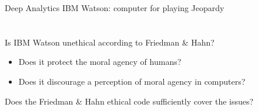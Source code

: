 \documentclass{beamer}
\begin{document}
\begin{frame}{Deep Analytics}
IBM Watson: computer for playing Jeopardy \\
\href{http://www.youtube.com/watch?v=14r0eD2HWbo&t=14m51s}{} \\
\href{http://www.youtube.com/watch?v=DywO4zksfXw}{} \\
\bigskip
Is IBM Watson unethical according to Friedman \& Hahn?
\begin{itemize}
\item Does it protect the moral agency of humans?
\item Does it discourage a perception of moral agency in computers?
\end{itemize}
\bigskip
Does the Friedman \& Hahn ethical code sufficiently cover the issues?
\end{frame}
\end{document}
